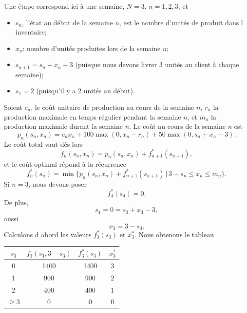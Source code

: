 \begin{example}
Une étape correspond ici à une semaine, $N = 3$, $n = 1, 2, 3$, et
\begin{itemize}
\item
 $s_n$, l'état au début de la semaine $n$, est le nombre d'unités de produit dans l inventaire;
\item
 $x_n$: nombre d'unités produites lors de la semaine $n$;
\item
 $s_{n+1} = s_n + x_n - 3$ (puisque nous devons livrer 3 unités au client à chaque semaine);
\item
 $s_1 = 2$ (puisqu'il y a 2 unités au début).
\end{itemize}
Soient $c_n$, le coût unitaire de production au cours de la semaine $n$, $r_n$ la production maximale en temps régulier pendant la semaine $n$, et $m_n$ la production maximale durant la semaine $n$.
Le coût au cours de la semaine $n$ est
\[
 p_n(s_n,x_n) = c_nx_n+100\max(0,x_n-r_n)+50\max(0,s_n+x_n-3).
\]
Le coût total vaut dès lors
\[
 f_n(s_n,x_n) = p_n(s_n,x_n) + f_{n+1}^*(s_{n+1}),
\]
et le coût optimal répond à la récurrence
\[
 f_n^*(s_n) = \min \lbrace p_n (s_n, x_n) + f_{n+1}^*(s_{n+1}) \, | \, 3-s_n \leq x_n \leq m_n \rbrace.
\]
Si $n = 3$, nous devons poser
\[
f_4^*(s_4) = 0.
\]
De plus,
\[
s_4 = 0 = s_3 + x_3 - 3,
\]
aussi
\[
x_3 = 3 - s_3.
\]
Calculons d abord les valeurs $f_3^*(s_3)$ et $x_3^*$.
Nous obtenons le tableau
\begin{center}
\begin{tabular}{|c|c|c|c|}
\hline
$s_3$ & $f_3(s_3,3-s_3)$ & $f_3^*(s_3)$ & $x_3^*$ \\
\hline
0 & 1400 & 1400 & 3 \\
\hline
1 & 900 & 900 & 2 \\
\hline
2 & 400 & 400 & 1 \\
\hline
$\geq 3$ & 0 & 0 & 0 \\
\hline
\end{tabular}
\end{center}


\end{example}

